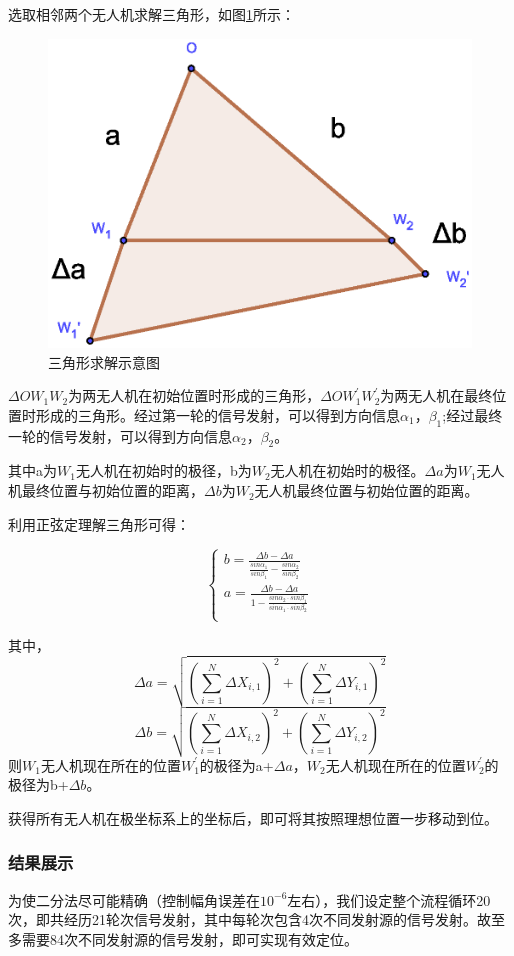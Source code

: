 \documentclass{ctexart}
\begin{document}
选取相邻两个无人机求解三角形，如图\ref{三角形求解示意图}所示：


\begin{figure}[H]
  \centering
  \includegraphics[width=0.35\linewidth]{pic/solution.eps}
  \caption{三角形求解示意图}
  \label{三角形求解示意图}
  \end{figure}



$\Delta OW_1W_2$为两无人机在初始位置时形成的三角形，$\Delta OW_1^{'}W_2^{'}$为两无人机在最终位置时形成的三角形。经过第一轮的信号发射，可以得到方向信息$\alpha_1$，$\beta_1$;经过最终一轮的信号发射，可以得到方向信息$\alpha_2$，$\beta_2$。

其中a为$W_1$无人机在初始时的极径，b为$W_2$无人机在初始时的极径。$\Delta a$为$W_1$无人机最终位置与初始位置的距离，$\Delta b$为$W_2$无人机最终位置与初始位置的距离。

利用正弦定理解三角形可得：

\begin{equation}
  \left\{
            \begin{array}{ll}
              b=\frac{\Delta b-\Delta a}{\frac{sin\alpha_1}{sin\beta_1}-\frac{sin\alpha_2}{sin\beta_2}}\\
              a=\frac{\Delta b-\Delta a}{1-\frac{sin\alpha_2\cdot sin\beta_1}{sin\alpha_1\cdot sin\beta_2}}\\


            \end{array}
          \right.
\end{equation}

其中，
\[
  \Delta a=\sqrt{(\sum_{i=1}^{N}\Delta X_{i,1})^2+(\sum_{i=1}^{N}\Delta Y_{i,1})^2}
\]
\[
  \Delta b=\sqrt{(\sum_{i=1}^{N}\Delta X_{i,2})^2+(\sum_{i=1}^{N}\Delta Y_{i,2})^2}
\]
则$W_1$无人机现在所在的位置$W_1^{'}$的极径为a+$\Delta a$，$W_2$无人机现在所在的位置$W_2^{'}$的极径为b+$\Delta b$。

获得所有无人机在极坐标系上的坐标后，即可将其按照理想位置一步移动到位。
\subsubsection{结果展示}
为使二分法尽可能精确（控制幅角误差在$10^{-6}$左右），我们设定整个流程循环20次，即共经历21轮次信号发射，其中每轮次包含4次不同发射源的信号发射。故至多需要84次不同发射源的信号发射，即可实现有效定位。
\end{document}
